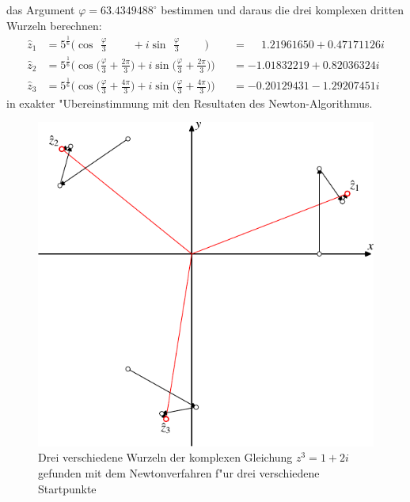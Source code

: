 \begin{beispiel}
das Argument $\varphi=63.4349488^\circ$ bestimmen und daraus
die drei komplexen dritten Wurzeln berechnen:
\begin{equation}
\begin{aligned}
\hat{z}_1
&=
5^{\frac16}
\biggl( \cos\phantom{\biggl(} \frac{\varphi}3
	\phantom{+\frac{2\pi}3\biggl)} \,
    +i\sin\phantom{\biggl(} \frac{\varphi}3
	\phantom{+\frac{4\pi}3\biggr)}\,\biggr)
&&=
\phantom{-}1.21961650 + 0.47171126i
\\
\hat{z}_2
&=
5^{\frac16} \biggl(\cos\biggl(\frac{\varphi}3+\frac{2\pi}3\biggr)
+i\sin\biggl(\frac{\varphi}3+\frac{2\pi}3\biggr)\biggr)
&&=
-1.01832219 + 0.82036324i
\\
\hat{z}_3
&=
5^{\frac16} \biggl(\cos\biggl(\frac{\varphi}3+\frac{4\pi}3\biggr)
+i\sin\biggl(\frac{\varphi}3+\frac{4\pi}3\biggr)\biggr)
&&=
-0.20129431 -1.29207451i
\end{aligned}
\end{equation}
in exakter "Ubereinstimmung mit den Resultaten des Newton-Algorithmus.
\end{beispiel}
\begin{figure}
\centering
\includegraphics{chapters/images/randwert-3.pdf}
\caption{Drei verschiedene Wurzeln der komplexen Gleichung $z^3=1+2i$
gefunden mit dem Newtonverfahren f"ur drei verschiedene Startpunkte
\label{newton:2dgraphik}}
\end{figure}


